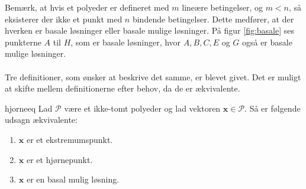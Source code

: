 %
Bemærk, at hvis et polyeder er defineret med $m$ lineære betingelser, og $m<n$, så eksisterer der ikke et punkt med $n$ bindende betingelser.
Dette medfører, at der hverken er basale løsninger eller basale mulige løsninger.
På figur \ref{fig:basale} ses punkterne $A$ til $H$, som er basale løsninger, hvor $A,B,C,E$ og $G$ også er basale mulige løsninger.
\\\\
%

%
Tre definitioner, som ønsker at beskrive det samme, er blevet givet.
Det er muligt at skifte mellem definitionerne efter behov, da de er ækvivalente.
%
\begin{thm}{}{hjorneeq}
Lad $\mathcal{P}$ være et ikke-tomt polyeder og lad vektoren $\textbf{x}\in \mathcal{P}$.
Så er følgende udsagn ækvivalente:
%
\begin{enumerate}[label=(\alph*)]
\item $\textbf{x}$ er et ekstremumspunkt.
\item $\textbf{x}$ er et hjørnepunkt.
\item $\textbf{x}$ er en basal mulig løsning.
\end{enumerate}
%
\end{thm}
%

